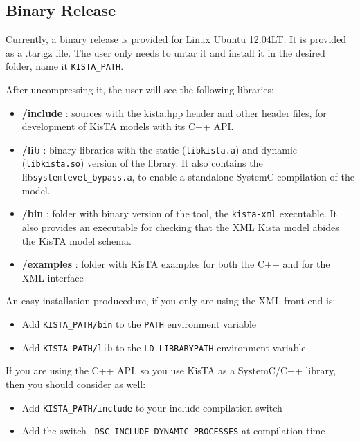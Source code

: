 \subsection{Binary Release}
\label{sec:install_bin}

Currently, a binary release is provided for Linux Ubuntu 12.04LT.
It is provided as a .tar.gz file. The user only needs to untar it
and install it in the desired folder, name it \texttt{KISTA\_PATH}.

After uncompressing it, the user will see the following libraries:

\begin{itemize}
\item \textbf{/include} : sources with the kista.hpp header and other header files, for development of KisTA models with its C++ API.
\item \textbf{/lib} : binary libraries with the static (\texttt{libkista.a}) and dynamic (\texttt{libkista.so}) version of the library. It also contains the lib\texttt{systemlevel\_bypass.a}, to enable a standalone SystemC compilation of the model.
\item \textbf{/bin} : folder with binary version of the tool, the \texttt{kista-xml} executable. It also provides an executable for checking that the XML Kista model abides the KisTA model schema.
\item \textbf{/examples} : folder with KisTA examples for both the C++ and for the XML interface
\end{itemize}

An easy installation producedure, if you only are using the XML front-end is:
\begin{itemize}
\item Add \texttt{KISTA\_PATH/bin} to the \texttt{PATH} environment variable
\item Add \texttt{KISTA\_PATH/lib} to the \texttt{LD\_LIBRARYPATH} environment variable
\end{itemize}

If you are using the C++ API, so you use KisTA as a SystemC/C++ library, then you should consider as well:

\begin{itemize}
\item Add \texttt{KISTA\_PATH/include} to your include compilation switch
\item Add the switch \texttt{-DSC\_INCLUDE\_DYNAMIC\_PROCESSES} at compilation time
\end{itemize}

